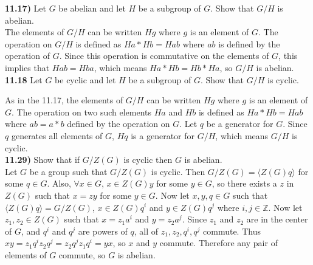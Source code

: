 \documentclass{scrartcl}
\begin{document}
\textbf{11.17)} Let $G$ be abelian and let $H$ be a subgroup of $G$. Show that $G/H$ is abelian.\\

The elements of $G/H$ can be written $Hg$ where $g$ is an element of $G$. The operation on $G/H$ is defined as $Ha*Hb=Hab$ where $ab$ is defined by the operation of $G$. Since this operation is commutative on the elements of $G$, this implies that $Hab=Hba$, which means $Ha*Hb=Hb*Ha$, so $G/H$ is abelian.\\

\textbf{11.18} Let $G$ be cyclic and let $H$ be a subgroup of $G$. Show that $G/H$ is cyclic.

As in the 11.17, the elements of $G/H$ can be written $Hg$ where $g$ is an element of $G$. The operation on two such elements $Ha$ and $Hb$ is defined as $Ha*Hb=Hab$ where $ab=a*b$ defined by the operation on $G$. Let $q$ be a generator for $G$. Since $q$ generates all elements of $G$, $Hq$ is a generator for $G/H$, which means $G/H$ is cyclic.\\

\textbf{11.29)} Show that if $G/Z(G)$ is cyclic then $G$ is abelian.\\

Let $G$ be a group such that $G/Z(G)$ is cyclic. Then $G/Z(G)=\langle Z(G)q \rangle$ for some $q \in G$. Also, $\forall x \in G$, $x \in Z(G)y$ for some $y \in G$, so there exists a $z$ in $Z(G)$ such that $x=zy$ for some $y \in G$. Now let $x,y,q \in G$ such that $\langle Z(G)q \rangle = G/Z(G)$, $x \in Z(G)q^i$ and $y \in Z(G)q^j$ where $i,j \in \mathbb{Z}$. Now let $z_1,z_2 \in Z(G)$ such that $x=z_1a^i$ and $y=z_2a^j$. Since $z_1$ and $z_2$ are in the center of $G$, and $q^i$ and $q^j$ are powers of $q$, all of $z_1,z_2,q^i,q^j$ commute. Thus $xy=z_1q^iz_2q^j=z_2q^jz_1q^i=yx$, so $x$ and $y$ commute. Therefore any pair of elements of $G$ commute, so $G$ is abelian.
\end{document}
